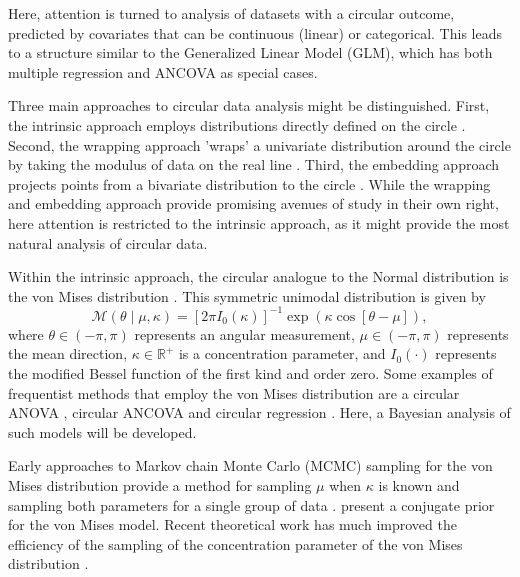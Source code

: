 Here, attention is turned to analysis of datasets with a circular outcome, predicted by covariates that can be continuous (linear) or categorical. This leads to a structure similar to the Generalized Linear Model (GLM), which has both multiple regression and ANCOVA as special cases.

Three main approaches to circular data analysis might be distinguished. First, the intrinsic approach employs distributions directly defined on the circle  \citep{fisher1992regression, artes2008hypothesis}. Second, the wrapping approach 'wraps' a univariate distribution around the circle by taking the modulus of data on the real line \citep{ferrari2009wrapping, coles1998inference}. Third, the embedding approach projects points from a bivariate distribution to the circle \citep{nunez2011bayesian, nunez2014bayesian, wang2014modeling, hernandez2015general, maruotti2016analyzing}. While the wrapping and embedding approach provide promising avenues of study in their own right, here attention is restricted to the intrinsic approach, as it might provide the most natural analysis of circular data.

Within the intrinsic approach, the circular analogue to the Normal distribution is the von Mises distribution \citep{von1918ganzzahligkeit}. This symmetric unimodal distribution is given by
\begin{equation}
\mathcal{M}(\theta \mid \mu, \kappa) = \left[ 2 \pi I_0(\kappa) \right]^{-1}
\exp \left( \kappa \cos \left[ \theta - \mu \right] \right),
\end{equation}
where \( \theta \in (-\pi, \pi) \) represents an angular measurement, \( \mu \in (-\pi, \pi) \) represents the mean direction, \( \kappa \in \mathbb{R}^+ \) is a concentration parameter, and \( I_0(\cdot) \) represents the modified Bessel function of the first kind and order zero. Some examples of frequentist methods that employ the von Mises distribution are a circular ANOVA \citep{watson1956construction}, circular ANCOVA \citep{artes2008hypothesis} and circular regression \citep{fisher1992regression}. Here, a Bayesian analysis of such models will be developed.

Early approaches to Markov chain Monte Carlo (MCMC) sampling for the von Mises distribution provide a method for sampling \( \mu \) when \( \kappa \) is known \citep{mardia1976bayesian} and sampling both parameters for a single group of data \citep{damien1999fullbayes}. \citet{guttorp1988finding} present a conjugate prior for the von Mises model. Recent theoretical work has much improved the efficiency of the sampling of the concentration parameter of the von Mises distribution \citep{forbes2015fast}.

